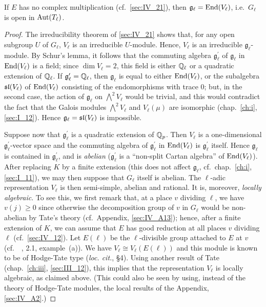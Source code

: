 \begin{thm}
	If $E$ has no complex multiplication (cf.\ \ref{sec:IV_21}), then
	$\mathfrak{g}_\ell = \operatorname{End}(V_\ell)$, i.e.\ $G_\ell$ is open in
	$\operatorname{Aut}(T_\ell)$.
\end{thm}
\begin{proof}
	The irreducibility theorem of \ref{sec:IV_21} shows that, for any open
	subgroup $U$ of $G_\ell$, $V_\ell$ is an irreducible $U$-module. Hence,
	$V_\ell$ is an irreducible $\mathfrak{g}_\ell$-module. By Schur's
	lemma, it follows that the commuting algebra $\mathfrak{g}^\prime_\ell$
	of $\mathfrak{g}_\ell$ in $\operatorname{End}(V_\ell)$ is a field; since $\dim V_\ell
	= 2$, this field is either $\mathbb{Q}_\ell$ or a quadratic extension of
	$\mathbb{Q}_\ell$.  If $\mathfrak{g}^\prime_\ell = \mathbb{Q}_\ell$, then
	$\mathfrak{g}_\ell$ is equal to either $\operatorname{End}(V_\ell)$, or the
	subalgebra $\operatorname{\mathfrak{sl}}(V_\ell)$
	\dpage
	of $\operatorname{End}(V_\ell)$ consisting of the endomorphisms with trace 0; but, in
	the second case, the action of $\mathfrak{g}_\ell$ on $\bigwedge^2
	V_\ell$ would be trivial, and this would contradict the fact that the
	Galois modules $\bigwedge^2 V_\ell$ and $V_\ell(\mu)$ are isomorphic
	(chap.~\ref{ch:i}, \ref{sec:I_12}). Hence $\mathfrak{g}_\ell =
	\operatorname{\mathfrak{sl}}(V_\ell)$ is impossible.

	Suppose now that $\mathfrak{g}_\ell^\prime$ is a quadratic extension of
	$\mathbb{Q}_p$. Then $V_\ell$ is a one-dimensional
	$\mathfrak{g}_\ell^\prime$-vector space and the commuting algebra of
	$\mathfrak{g}_\ell^\prime$ in $\operatorname{End}(V_\ell)$ is
	$\mathfrak{g}_\ell^\prime$ itself. Hence $\mathfrak{g}_\ell$ is
	contained in $\mathfrak{g}_\ell^\prime$, and is \emph{abelian}
	($\mathfrak{g}_\ell^\prime$ is a ``non-split Cartan algebra'' of
	$\operatorname{End}(V_\ell)$).  After replacing $K$ by a finite extension (this does
	not affect $\mathfrak{g}_\ell$, cf.\ chap.~\ref{ch:i}, \ref{sec:I_11}),
	we may then suppose that $G_\ell$ itself is abelian. The $\ell$-adic
	representation $V_\ell$ is then semi-simple, abelian and rational.  It
	is, moreover, \emph{locally algebraic}. To see this, we first remark
	that, at a place $v$ dividing $\ell$, we have $v(j) \ge 0$ since
	otherwise the decomposition group of $v$ in $G_\ell$ would be
	non-abelian by Tate's theory (cf.\ Appendix, \ref{sec:IV_A13}); hence,
	after a finite extension of $K$, we can assume that $E$ has good
	reduction at all places $v$ dividing $\ell$ (cf.\ \ref{sec:IV_12}). Let
	$E(\ell)$ be the $\ell$-divisible group attached to $E$ at $v$ (cf.\ 
	\citeauthor{39}~\cite{39}, 2.1, example~(a)). We have $V_\ell \cong
	V_\ell(E(\ell))$ and this module is known to be of Hodge-Tate type
	(\emph{loc. cit.}, \S 4). Using another result of Tate
	(chap.~\ref{ch:iii}, \ref{sec:III_12}), this implies that the
	representation $V_\ell$ is locally algebraic, as claimed above. (This
	could also be seen by using, instead of the theory of Hodge-Tate
	modules, the local results of the Appendix, \ref{sec:IV_A2}.)


\end{proof}
